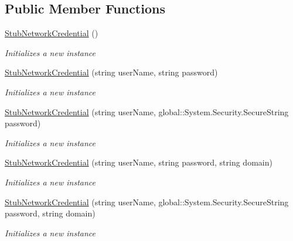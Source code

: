 \subsection*{Public Member Functions}
\begin{DoxyCompactItemize}
\item 
\hyperlink{class_system_1_1_net_1_1_fakes_1_1_stub_network_credential_a003016ddceaaa4ccd67fd7bfaaa598d4}{Stub\-Network\-Credential} ()
\begin{DoxyCompactList}\small\item\em Initializes a new instance\end{DoxyCompactList}\item 
\hyperlink{class_system_1_1_net_1_1_fakes_1_1_stub_network_credential_a1a1acb5c38cc976264456a52b2ee8b3b}{Stub\-Network\-Credential} (string user\-Name, string password)
\begin{DoxyCompactList}\small\item\em Initializes a new instance\end{DoxyCompactList}\item 
\hyperlink{class_system_1_1_net_1_1_fakes_1_1_stub_network_credential_af3c9b10542aaa5232dd9d9e6f7bca7f2}{Stub\-Network\-Credential} (string user\-Name, global\-::\-System.\-Security.\-Secure\-String password)
\begin{DoxyCompactList}\small\item\em Initializes a new instance\end{DoxyCompactList}\item 
\hyperlink{class_system_1_1_net_1_1_fakes_1_1_stub_network_credential_a050ba205aa1ff16ff941a2d4d9eaf8f0}{Stub\-Network\-Credential} (string user\-Name, string password, string domain)
\begin{DoxyCompactList}\small\item\em Initializes a new instance\end{DoxyCompactList}\item 
\hyperlink{class_system_1_1_net_1_1_fakes_1_1_stub_network_credential_ac4dd39f051cb316e11c838d6686f8d06}{Stub\-Network\-Credential} (string user\-Name, global\-::\-System.\-Security.\-Secure\-String password, string domain)
\begin{DoxyCompactList}\small\item\em Initializes a new instance\end{DoxyCompactList}\end{DoxyCompactItemize}
